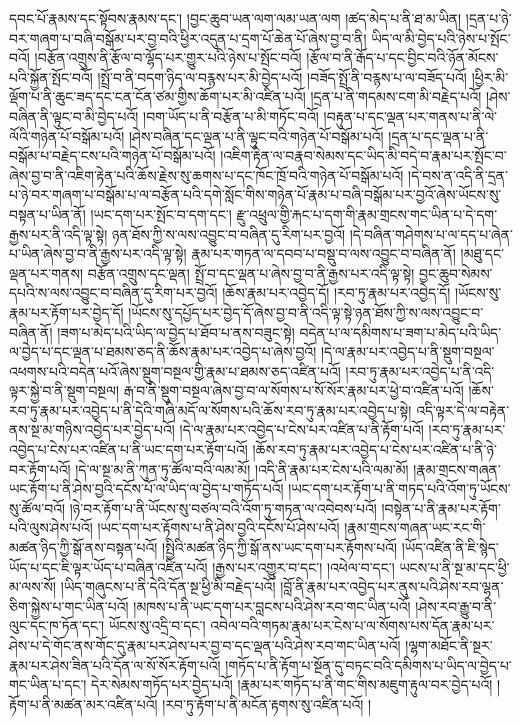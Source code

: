 དབང་པོ་རྣམས་དང་སྟོབས་རྣམས་དང་། །བྱང་ཆུབ་ཡན་ལག་ལམ་ཡན་ལག །ཚད་མེད་པ་ནི་ཐ་མ་ཡིན། །དྲན་པ་ཉེ་བར་གཞག་པ་བཞི་བསྒོམ་པར་བྱ་བའི་ཕྱིར་འདུན་པ་དྲག་པོ་ཆེན་པོ་ཞེས་བྱ་བ་ནི། ཡིད་ལ་མི་བྱེད་པའི་ཉེས་པ་སྤོང་བའོ། །བརྩོན་འགྲུས་ནི་རྩོལ་བ་ལྷོད་པར་གྱུར་པའི་ཉེས་པ་སྤོང་བའོ། །རྩོལ་བ་ནི་རྒོད་པ་དང་བྱིང་བའི་ཉོན་མོངས་པའི་སྐྱོན་སྤོང་བའོ། །སྤྲོ་བ་ནི་བདག་ཉིད་ལ་བརྙས་པར་མི་བྱེད་པའོ། །བཟོད་སྤྲོ་ནི་བརྙས་པ་ལ་བཟོད་པའོ། །ཕྱིར་མི་ལྡོག་པ་ནི་ཆུང་ཟད་དང་ངན་ངོན་ཙམ་གྱིས་ཆོག་པར་མི་འཛིན་པའོ། །དྲན་པ་ནི་གདམས་ངག་མི་བརྗེད་པའོ། །ཤེས་བཞིན་ནི་ལྟུང་བ་མི་བྱེད་པའོ། །བག་ཡོད་པ་ནི་བརྩོན་པ་མི་གཏོང་བའོ། །བརྟུན་པ་དང་ལྡན་པར་གནས་པ་ནི་ལེ་ལོའི་གཉེན་པོ་བསྒོམ་པའོ། །ཤེས་བཞིན་དང་ལྡན་པ་ནི་ལྟུང་བའི་གཉེན་པོ་བསྒོམ་པའོ། །དྲན་པ་དང་ལྡན་པ་ནི་བསྒོམ་པ་བརྗེད་ངས་པའི་གཉེན་པོ་བསྒོམ་པའོ། །འཇིག་རྟེན་ལ་བརྣབ་སེམས་དང་ཡིད་མི་བདེ་བ་རྣམ་པར་སྤོང་བ་ཞེས་བྱ་བ་ནི་འཇིག་རྟེན་པའི་ཆོས་རྗེས་སུ་ཆགས་པ་དང་ཁོང་ཁྲོ་བའི་གཉེན་པོ་བསྒོམ་པའོ། །དེ་བས་ན་འདི་ནི་དྲན་པ་ཉེ་བར་གཞག་པ་བསྒོམ་པ་ལ་བརྩོན་པའི་དགེ་སློང་གིས་གཉེན་པོ་རྣམ་པ་བཞི་བསྒོམ་པར་བྱའོ་ཞེས་ཡོངས་སུ་བསྟན་པ་ཡིན་ནོ། །ཡང་དག་པར་སྤོང་བ་དག་དང་། རྫུ་འཕྲུལ་གྱི་རྐང་པ་དག་གི་རྣམ་གྲངས་གང་ཡིན་པ་དེ་དག་རྒྱས་པར་ནི་འདི་ལྟ་སྟེ། ཉན་ཐོས་ཀྱི་ས་ལས་འབྱུང་བ་བཞིན་དུ་རིག་པར་བྱའོ། །དེ་བཞིན་གཤེགས་པ་ལ་དད་པ་ཞེན་པ་ཡིན་ཞེས་བྱ་བ་ནི་རྒྱས་པར་འདི་ལྟ་སྟེ། རྣམ་པར་གཏན་ལ་དབབ་པ་བསྡུ་བ་ལས་འབྱུང་བ་བཞིན་ནོ། །མཐུ་དང་ལྡན་པར་གནས། བརྩོན་འགྲུས་དང་ལྡན། སྤྲོ་བ་དང་ལྡན་པ་ཞེས་བྱ་བ་ནི་རྒྱས་པར་འདི་ལྟ་སྟེ། བྱང་ཆུབ་སེམས་དཔའི་ས་ལས་འབྱུང་བ་བཞིན་དུ་རིག་པར་བྱའོ། །ཆོས་རྣམ་པར་འབྱེད་དོ། །རབ་ཏུ་རྣམ་པར་འབྱེད་དོ། །ཡོངས་སུ་རྣམ་པར་རྟོག་པར་བྱེད་དོ། །ཡོངས་སུ་དཔྱོད་པར་བྱེད་དོ་ཞེས་བྱ་བ་ནི་འདི་ལྟ་སྟེ་ཉན་ཐོས་ཀྱི་ས་ལས་འབྱུང་བ་བཞིན་ནོ། །ཟག་པ་མེད་པའི་ཡིད་ལ་བྱེད་པ་ཐོབ་པ་ནས་བཟུང་སྟེ། བདེན་པ་ལ་དམིགས་པ་ཟག་པ་མེད་པའི་ཡིད་ལ་བྱེད་པ་དང་ལྡན་པ་ཐམས་ཅད་ནི་ཆོས་རྣམ་པར་འབྱེད་པ་ཞེས་བྱའོ། །དེ་ལ་རྣམ་པར་འབྱེད་པ་ནི་སྡུག་བསྔལ་འཕགས་པའི་བདེན་པའོ་ཞེས་སྡུག་བསྔལ་གྱི་རྣམ་པ་ཐམས་ཅད་འཛིན་པའོ། །རབ་ཏུ་རྣམ་པར་འབྱེད་པ་ནི་འདི་ལྟར་སྐྱེ་བ་ནི་སྡུག་བསྔལ། རྒ་བ་ནི་སྡུག་བསྔལ་ཞེས་བྱ་བ་ལ་སོགས་པ་སོ་སོར་རྣམ་པར་ཕྱེ་བ་འཛིན་པའོ། །ཆོས་རབ་ཏུ་རྣམ་པར་འབྱེད་པ་ནི་དེའི་གཞི་མདོ་ལ་སོགས་པའི་ཆོས་རབ་ཏུ་རྣམ་པར་འབྱེད་པ་སྟེ། འདི་ལྟར་དེ་ལ་བརྟེན་ནས་སྔ་མ་གཉིས་འབྱེད་པར་བྱེད་པའོ། །དེ་ལ་རྣམ་པར་འབྱེད་པ་ངེས་པར་འཛིན་པ་ནི་རྟོག་པའོ། །རབ་ཏུ་རྣམ་པར་འབྱེད་པ་ངེས་པར་འཛིན་པ་ནི་ཡང་དག་པར་རྟོག་པའོ། །ཆོས་རབ་ཏུ་རྣམ་པར་འབྱེད་པ་ངེས་པར་འཛིན་པ་ནི་ཉེ་བར་རྟོག་པའོ། །དེ་ལ་སྔ་མ་ནི་ཀུན་ཏུ་ཚོལ་བའི་ལམ་མོ། །འདི་ནི་རྣམ་པར་ངེས་པའི་ལམ་མོ། །རྣམ་གྲངས་གཞན་ཡང་རྟོག་པ་ནི་ཤེས་བྱའི་དངོས་པོ་ལ་ཡིད་ལ་བྱེད་པ་གཏོད་པའོ། །ཡང་དག་པར་རྟོག་པ་ནི་གཏད་པའི་འོག་ཏུ་ཡོངས་སུ་ཚོལ་བའོ། །ཉེ་བར་རྟོག་པ་ནི་ཡོངས་སུ་བཙལ་བའི་འོག་ཏུ་གཏན་ལ་འབེབས་པའོ། །བསྟེན་པ་ནི་རྣམ་པར་རྟོག་པའི་ལུས་ཤེས་པའོ། །ཡང་དག་པར་རྟོགས་པ་ནི་ཤེས་བྱའི་དངོས་པོ་ཤེས་པའོ། །རྣམ་གྲངས་གཞན་ཡང་རང་གི་མཚན་ཉིད་ཀྱི་སྒོ་ནས་བསྟན་པའོ། །སྤྱིའི་མཚན་ཉིད་ཀྱི་སྒོ་ནས་ཡང་དག་པར་རྟོགས་པའོ། །ཡོད་འཛིན་ནི་ཇི་སྙེད་ཡོད་པ་དང་ཇི་ལྟར་ཡོད་པ་བཞིན་འཛིན་པའོ། །རྒྱས་པར་འགྱུར་བ་དང་། །འཕེལ་བ་དང་། ཡངས་པ་ནི་སྔ་མ་དང་ཕྱི་མ་ལས་སོ། །ཡིད་གཞུངས་པ་ནི་དེའི་དོན་སྔ་ཕྱི་མི་བརྗེད་པའོ། །བློ་ནི་རྣམ་པར་འབྱེད་པར་ནུས་པའི་ཤེས་རབ་ལྷན་ཅིག་སྐྱེས་པ་གང་ཡིན་པའོ། །མཁས་པ་ནི་ཡང་དག་པར་བླངས་པའི་ཤེས་རབ་གང་ཡིན་པའོ། །ཤེས་རབ་རྒྱུ་བ་ནི་ལུང་དང་ཁ་ཏོན་དང་། ཡོངས་སུ་འདྲི་བ་དང་། འབེལ་བའི་གཏམ་རྣམ་པར་ངེས་པ་ལ་སོགས་པས་དོན་རྣམ་པར་ཤེས་པ་དེ་གོང་ནས་གོང་དུ་རྣམ་པར་ཤེས་པར་བྱ་བ་དང་ལྡན་པའི་ཤེས་རབ་གང་ཡིན་པའོ། །ལྷག་མཐོང་ནི་སྔར་རྣམ་པར་ཤེས་ཟིན་པའི་དོན་ལ་སོ་སོར་རྟོག་པའོ། །གཏོད་པ་ནི་རྟོག་པ་སྔོན་དུ་བཏང་བའི་དམིགས་པ་ཡིད་ལ་བྱེད་པ་གང་ཡིན་པ་དང་། དེར་སེམས་གཏོད་པར་བྱེད་པའོ། །རྣམ་པར་གཏོད་པ་ནི་གང་གིས་མཇུག་རྟུལ་བར་བྱེད་པའོ། །རྟོག་པ་ནི་མཚན་མར་འཛིན་པའོ། །རབ་ཏུ་རྟོག་པ་ནི་མངོན་རྟགས་སུ་འཛིན་པའོ། །
